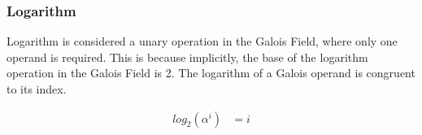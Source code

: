 \subsubsection{Logarithm} Logarithm is considered a unary operation in the
Galois Field, where only one operand is required. This is because implicitly,
the base of the logarithm operation in the Galois Field is 2. The logarithm of
a Galois operand is congruent to its index.

    \begin{equation*}
        \begin{split}
            log_{2}(\alpha^{i}) & = i \\
        \end{split}
    \end{equation*}
\newpage
